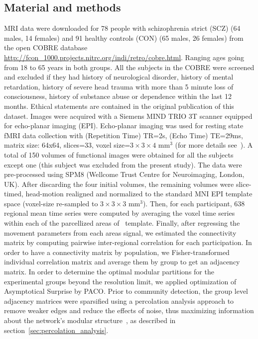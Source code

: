 \subsection{Material and methods}
MRI data were downloaded for 78 people with schizophrenia strict (SCZ) (64 males, 14 females) and 91 healthy controls (CON) (65 males, 26 females) from the open COBRE database \url{http://fcon_1000.projects.nitrc.org/indi/retro/cobre.html}.
Ranging ages going from 18 to 65 years in both groups.
All the subjects in the COBRE were screened and excluded if they had history of neurological disorder, history of mental retardation, history of severe head trauma with more than 5 minute loss of consciousness, history of substance abuse or dependence within the last 12 months.
Ethical statements are contained in the original publication of this dataset.
Images were acquired with a Siemens MIND TRIO 3T scanner equipped for echo-planar imaging (EPI).
Echo-planar imaging was used for resting state fMRI data collection with (Repetition Time) TR=2s, (Echo Time) TE=29ms, matrix size: 64x64, slices=33, voxel size=$3 \times 3 \times 4$ mm$^3$ (for more details see~\cite{cetin2014}).
A total of 150 volumes of functional images were obtained for all the subjects except one (this subject was excluded from the present study).
The data were pre-processed using SPM8 (Wellcome Trust Centre for Neuroimaging, London, UK).
After discarding the four initial volumes, the remaining volumes were slice-timed, head-motion realigned and normalized to the standard MNI EPI template space (voxel-size re-sampled to $3 \times 3 \times 3$ mm$^3$).
Then, for each participant, 638 regional mean time series were computed by averaging the voxel time series within each of the parcellized areas of~\cite{crossley2013a} template. 
Finally, after regressing the movement parameters from each areas signal, we estimated the connectivity matrix by computing pairwise inter-regional correlation for each participation.
In order to have a connectivity matrix by population, we Fisher-transformed individual correlation matrix and average them by group  to get an adjacency matrix.
In order to determine the optimal modular partitions for the experimental groups beyond the resolution limit, we applied optimization of Asymptotical Surprise by PACO.
Prior to community detection, the group level adjacency matrices were sparsified using a percolation analysis approach to remove weaker edges and reduce the effects of noise, thus maximizing information about the network's modular structure~\cite{nicolini2017,bardella2016a,gallos2012}, as described in section~\ref{sec:percolation_analysis}.
